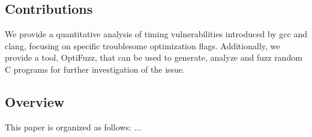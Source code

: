 \subsection{Contributions}
We provide a quantitative analysis of timing vulnerabilities introduced by gcc and clang, focusing on specific troublesome optimization flags.
Additionally, we provide a tool, OptiFuzz, that can be used to generate, analyze and fuzz random C programs for further investigation of the issue.
\subsection{Overview}
This paper is organized as follows: $\ldots$ 
